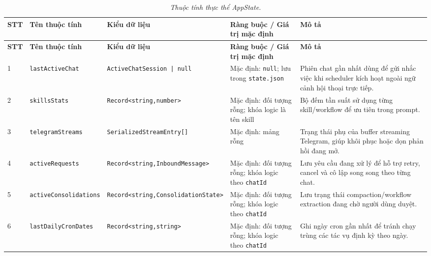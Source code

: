 \begin{longtable}{|p{0.55cm}|p{2.55cm}|p{2.7cm}|p{3.25cm}|p{4.0cm}|}
\caption{\emph{Thuộc tính thực thể AppState.}}\label{tab:erd-app-state}\\
\hline
\textbf{STT} & \textbf{Tên thuộc tính} & \textbf{Kiểu dữ liệu} & \textbf{Ràng buộc / Giá trị mặc định} & \textbf{Mô tả} \\
\hline
\endfirsthead
\hline
\textbf{STT} & \textbf{Tên thuộc tính} & \textbf{Kiểu dữ liệu} & \textbf{Ràng buộc / Giá trị mặc định} & \textbf{Mô tả} \\
\hline
\endhead
1 & \texttt{lastActiveChat} & \texttt{ActiveChat}\newline\texttt{Session | null} & Mặc định: \texttt{null}; lưu trong \texttt{state.json} & Phiên chat gần nhất dùng để gửi nhắc việc khi scheduler kích hoạt ngoài ngữ cảnh hội thoại trực tiếp. \\
\hline
2 & \texttt{skillsStats} & \texttt{Record<string,}\newline\texttt{number>} & Mặc định: đối tượng rỗng; khóa logic là tên skill & Bộ đếm tần suất sử dụng từng skill/workflow để ưu tiên trong prompt. \\
\hline
3 & \texttt{telegramStreams} & \texttt{Serialized}\newline\texttt{StreamEntry[]} & Mặc định: mảng rỗng & Trạng thái phụ của buffer streaming Telegram, giúp khôi phục hoặc dọn phản hồi đang mở. \\
\hline
4 & \texttt{activeRequests} & \texttt{Record<string,}\newline\texttt{InboundMessage>} & Mặc định: đối tượng rỗng; khóa logic theo \texttt{chatId} & Lưu yêu cầu đang xử lý để hỗ trợ retry, cancel và cô lập song song theo từng chat. \\
\hline
5 & \texttt{active}\newline\texttt{Consolidations} & \texttt{Record<string,}\newline\texttt{Consolidation}\newline\texttt{State>} & Mặc định: đối tượng rỗng; khóa logic theo \texttt{chatId} & Lưu trạng thái compaction/workflow extraction đang chờ người dùng duyệt. \\
\hline
6 & \texttt{lastDaily}\newline\texttt{CronDates} & \texttt{Record<string,}\newline\texttt{string>} & Mặc định: đối tượng rỗng; khóa logic theo \texttt{chatId} & Ghi ngày cron gần nhất để tránh chạy trùng các tác vụ định kỳ theo ngày. \\
\hline
\end{longtable}

